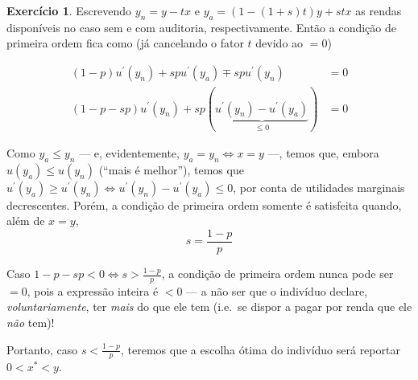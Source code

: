 \documentclass[12pt]{article}
\numberwithin{equation}{section}
\theoremstyle{plain}
\theoremstyle{definition}
\newtheorem{exercise}{Exercício}
\theoremstyle{remark}
\begin{document}
\begin{exercise}
Escrevendo \(y_{n} = y-tx\) e \(y_{a}=(1-(1+s)t)y + stx\) as rendas
disponíveis no caso sem e com auditoria, respectivamente. Então a
condição de primeira ordem fica como (já cancelando o fator \(t\) devido
ao \(=0\))

\begin{align*}
(1-p) u^\prime(y_{n}) + sp u^\prime(y_{a}) \mp sp u^\prime(y_{n}) &= 0 \\
(1-p - sp) u^\prime(y_{n}) + sp (\underbrace{ u^\prime(y_{n}) - u^\prime(y_{a}) }_{ \leq 0 }) &=0
\end{align*}

Como \(y_{a} \leq y_{n}\) --- e, evidentemente,
\(y_{a}=y_{n} \iff x = y\) ---, temos que, embora
\(u(y_{a}) \leq u(y_{n})\) (``mais é melhor''), temos que
\(u^\prime(y_{a}) \geq u^\prime(y_{n}) \iff u^\prime(y_{n})- u^\prime(y_{a}) \leq 0\),
por conta de utilidades marginais decrescentes. Porém, a condição de
primeira ordem somente é satisfeita quando, além de \(x=y\),
\[
s = \frac{1-p}{p}
\]

Caso \(1- p - sp < 0 \iff s > \frac{1-p}{p}\), a condição de primeira
ordem nunca pode ser \(=0\), pois a expressão inteira é \(<0\) --- a não
ser que o indivíduo declare, \textit{voluntariamente}, ter \textit{mais}
do que ele tem (i.e.~se dispor a pagar por renda que ele \textit{não}
tem)!

Portanto, caso \(s < \frac{1-p}{p}\), teremos que a escolha ótima do
indivíduo será reportar \(0 < x^{*} < y\).
\end{exercise}
\end{document}
